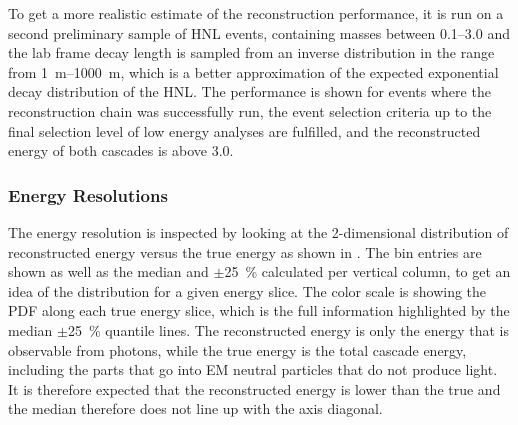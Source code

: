 To get a more realistic estimate of the reconstruction performance, it is run on a second preliminary sample of HNL events, containing masses between \SIrange[range-phrase=~and~]{0.1}{3.0}{\gev} and the lab frame decay length is sampled from an inverse distribution in the range from \SIrange{1}{1000}{\meter}, which is a better approximation of the expected exponential decay distribution of the HNL. The performance is shown for events where the reconstruction chain was successfully run, the event selection criteria up to the final selection level of low energy analyses are fulfilled, and the reconstructed energy of both cascades is above \SI{3.0}{\gev}.


\subsubsection{Energy Resolutions} 

The energy resolution is inspected by looking at the 2-dimensional distribution of reconstructed energy versus the true energy as shown in . The bin entries are shown as well as the median and $\pm$\SI{25}{\percent} calculated per vertical column, to get an idea of the distribution for a given energy slice. The color scale is showing the PDF along each true energy slice, which is the full information highlighted by the median $\pm$\SI{25}{\percent} quantile lines. The reconstructed energy is only the energy that is observable from photons, while the true energy is the total cascade energy, including the parts that go into EM neutral particles that do not produce light. It is therefore expected that the reconstructed energy is lower than the true and the median therefore does not line up with the axis diagonal.

